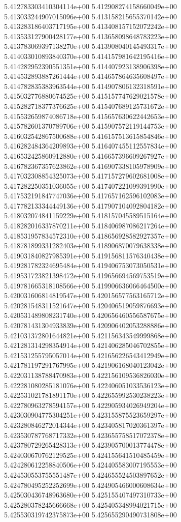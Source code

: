 5.412783303410304114e+00
5.412908274158660049e+00
5.413033244907015096e+00
5.413158215655370142e+00
5.413283186403717195e+00
5.413408157152072242e+00
5.413533127900428177e+00
5.413658098648783223e+00
5.413783069397138270e+00
5.413908040145493317e+00
5.414033010893840370e+00
5.414157981642195416e+00
5.414282952390551351e+00
5.414407923138906398e+00
5.414532893887261444e+00
5.414657864635608497e+00
5.414782835383963544e+00
5.414907806132318591e+00
5.415032776880674525e+00
5.415157747629021578e+00
5.415282718377376625e+00
5.415407689125731672e+00
5.415532659874086718e+00
5.415657630622442653e+00
5.415782601370789706e+00
5.415907572119144753e+00
5.416032542867500688e+00
5.416157513615854846e+00
5.416282484364209893e+00
5.416407455112557834e+00
5.416532425860912880e+00
5.416657396609267927e+00
5.416782367357623862e+00
5.416907338105978909e+00
5.417032308854325073e+00
5.417157279602681008e+00
5.417282250351036055e+00
5.417407221099391990e+00
5.417532191847747036e+00
5.417657162596102083e+00
5.417782133344449136e+00
5.417907104092804182e+00
5.418032074841159229e+00
5.418157045589515164e+00
5.418282016337870211e+00
5.418406987086217264e+00
5.418531957834572310e+00
5.418656928582927357e+00
5.418781899331282403e+00
5.418906870079638338e+00
5.419031840827985391e+00
5.419156811576340438e+00
5.419281782324695484e+00
5.419406753073050531e+00
5.419531723821398472e+00
5.419656694569753519e+00
5.419781665318108566e+00
5.419906636066464500e+00
5.420031606814819547e+00
5.420156577563165712e+00
5.420281548311521647e+00
5.420406519059876693e+00
5.420531489808231740e+00
5.420656460556587675e+00
5.420781431304933839e+00
5.420906402053288886e+00
5.421031372801644821e+00
5.421156343549999868e+00
5.421281314298354914e+00
5.421406285046702855e+00
5.421531255795057014e+00
5.421656226543412949e+00
5.421781197291767995e+00
5.421906168040123042e+00
5.422031138788470983e+00
5.422156109536826030e+00
5.422281080285181076e+00
5.422406051033536123e+00
5.422531021781891170e+00
5.422655992530238223e+00
5.422780963278594157e+00
5.422905934026949204e+00
5.423030904775304251e+00
5.423155875523659297e+00
5.423280846272014344e+00
5.423405817020361397e+00
5.423530787768717332e+00
5.423655758517072378e+00
5.423780729265428313e+00
5.423905700013774478e+00
5.424030670762129525e+00
5.424155641510485459e+00
5.424280612258840506e+00
5.424405583007195553e+00
5.424530553755551487e+00
5.424655524503897652e+00
5.424780495252252699e+00
5.424905466000608634e+00
5.425030436748963680e+00
5.425155407497310733e+00
5.425280378245666668e+00
5.425405348994021715e+00
5.425530319742375873e+00
5.425655290490731808e+00
